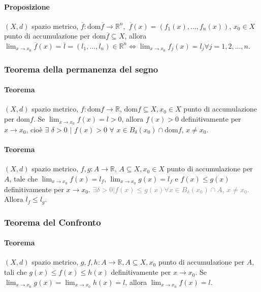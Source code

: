 \documentclass{article}
\newcommand{\R}{\mathbb{R}}
\newcommand{\dom}{\text{dom}}
\begin{document}
\paragraph{Proposizione}
$(X,d)$ spazio metrico, $\overline{f}: \dom\overline{f} \rightarrow \R^n,\,\, \overline{f}(x)=(f_1(x),...,f_n(x))$, $x_0 \in X$ punto di accumulazione per $\dom \overline{f} \subseteq X$, allora $\lim_{x \rightarrow x_0} \overline{f}(x)=\overline{l}=(l_1,...,l_n)\in \R^n \Leftrightarrow \lim_{x \rightarrow x_0} f_j(x)=l_j \forall j=1,2,...,n$.

\subsubsection{Teorema della permanenza del segno}
\paragraph{{Teorema}}
$(X,d)$ spazio metrico, $f: \dom f \rightarrow\R$, $\dom f \subseteq X, x_0 \in X$ punto di accumulazione per $\dom f$.
Se $\lim_{x \rightarrow x_0} f(x) = l >0$, allora $f(x)>0$ definitivamente per $ x \rightarrow x_0$, cioè $\exists \,\, \delta >0 \,\, |\,\, f(x)>0 \,\, \forall \,\, x \in B_\delta (x_0)\cap \dom f$, $x \neq x_0$. 

\paragraph{{Teorema}}
$(X,d)$ spazio metrico, $f,g: A \rightarrow\R$, $A \subseteq X, x_0 \in X$ punto di accumulazione per $A$, tale che $\lim_{x \rightarrow x_0} f(x) =l_f$, $\lim_{x \rightarrow x_0} g(x)=l_f$ e $f(x)\leq g(x)$ definitivamente per $x \rightarrow x_0$. \textcolor{grey}{$\exists \delta > 0 | f(x) \leq g(x) \forall x \in B_\delta (x_0) \cap A$, $x \neq x_0$.} Allora $l_f \leq l_g$.

\subsubsection{Teorema del Confronto}
\paragraph{Teorema}
$(X,d)$ spazio metrico, $g,f,h : A \rightarrow \R, A \subseteq X, x_0$ punto di accumulazione per $A$, tali che $g(x) \leq f(x)\leq h(x)$ definitivamente per $x \rightarrow x_0$. Se $\lim_{x \rightarrow x_0} g(x)=\lim_{x \rightarrow x_0} h(x)=l$, allora $\lim_{x \rightarrow x_0} f(x)=l$.
\end{document}
